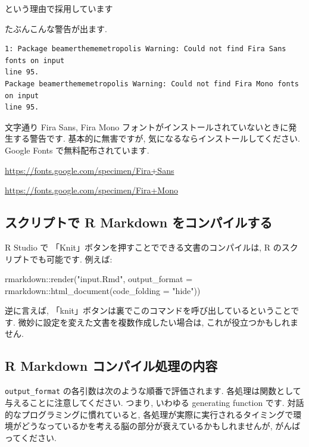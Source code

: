 \documentclass[
]{ltjsarticle}
\newenvironment{Shaded}{\begin{snugshade}}{\end{snugshade}}
\newcommand{\AttributeTok}[1]{\textcolor[rgb]{0.77,0.63,0.00}{#1}}
\newcommand{\FunctionTok}[1]{\textcolor[rgb]{0.00,0.00,0.00}{#1}}
\newcommand{\NormalTok}[1]{#1}
\newcommand{\SpecialCharTok}[1]{\textcolor[rgb]{0.00,0.00,0.00}{#1}}
\newcommand{\StringTok}[1]{\textcolor[rgb]{0.31,0.60,0.02}{#1}}
\begin{document}
という理由で採用しています

たぶんこんな警告が出ます.

\begin{verbatim}
1: Package beamerthememetropolis Warning: Could not find Fira Sans fonts on input 
line 95.
Package beamerthememetropolis Warning: Could not find Fira Mono fonts on input 
line 95.
\end{verbatim}

文字通り Fira Sans, Fira Mono フォントがインストールされていないときに発生する警告です. 基本的に無害ですが, 気になるならインストールしてください. Google Fonts で無料配布されています.

\url{https://fonts.google.com/specimen/Fira+Sans}

\url{https://fonts.google.com/specimen/Fira+Mono}

\hypertarget{ux30b9ux30afux30eaux30d7ux30c8ux3067-r-markdown-ux3092ux30b3ux30f3ux30d1ux30a4ux30ebux3059ux308b}{%
\subsection{スクリプトで R Markdown をコンパイルする}\label{ux30b9ux30afux30eaux30d7ux30c8ux3067-r-markdown-ux3092ux30b3ux30f3ux30d1ux30a4ux30ebux3059ux308b}}

R Studio で 「Knit」ボタンを押すことでできる文書のコンパイルは, R のスクリプトでも可能です. 例えば:

\begin{Shaded}
\begin{Highlighting}[numbers=left,,]
\NormalTok{rmarkdown}\SpecialCharTok{::}\FunctionTok{render}\NormalTok{(}\StringTok{"input.Rmd"}\NormalTok{, }\AttributeTok{output\_format =}\NormalTok{ rmarkdown}\SpecialCharTok{::}\FunctionTok{html\_document}\NormalTok{(}\AttributeTok{code\_folding =} \StringTok{"hide"}\NormalTok{))}
\end{Highlighting}
\end{Shaded}

逆に言えば, 「knit」ボタンは裏でこのコマンドを呼び出しているということです. 微妙に設定を変えた文書を複数作成したい場合は, これが役立つかもしれません.

\hypertarget{rmd-flow}{%
\subsection{R Markdown コンパイル処理の内容}\label{rmd-flow}}

\texttt{output\_format} の各引数は次のような順番で評価されます. 各処理は関数として与えることに注意してください. つまり, いわゆる generating function です. 対話的なプログラミングに慣れていると, 各処理が実際に実行されるタイミングで環境がどうなっているかを考える脳の部分が衰えているかもしれませんが, がんばってください.
\end{document}
